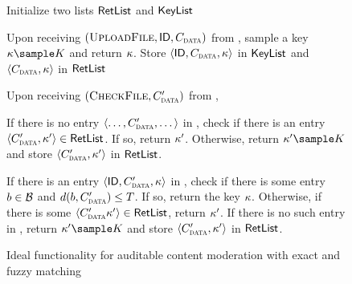 \begin{figure}[h]
{\begin{minipage}[t]{\textwidth}
		
		\enumListStartResume
		\item Initialize two lists $\mathsf{RetList}$ and $\mathsf{KeyList}$ 
		\item Upon receiving $(\uploadFile, \genericFileID, \clientMeta)$ from \client, sample a key $\genericSymmKey \getsr \encryptKeySpace$ and return $\kappa$. Store $\langle \genericFileID, \clientMeta, \genericSymmKey \rangle$ in $\mathsf{KeyList}$ and $\langle \clientMeta, \genericSymmKey \rangle$ in $\mathsf{RetList}$  

		
		\item Upon receiving $(\checkContent,  \clientMeta')$ from \server, 
		\enumListStartResume
		\item If there is no entry $\langle \dots, \clientMeta', \dots \rangle$ in \keyList, check if there is an entry $\langle \clientMeta', \genericSymmKey' \rangle \in \retList$. If so, return $\kappa'$. Otherwise, return $	\genericSymmKey' \getsr \encryptKeySpace$ and store $\langle \clientMeta', \genericSymmKey' \rangle$ in $\mathsf{RetList}$. 
		\item If there is an entry $\langle \genericFileID, \clientMeta', \genericSymmKey \rangle$ in \keyList, check if 
there is some entry $\genericBlocklistElmt \in \blocklist$ and $\distanceNotation[\distance][\genericBlocklistElmt][\clientMeta'] \le \threshold$. If so, return the key $\kappa$. Otherwise, if there is some $\langle \clientMeta' \genericSymmKey' \rangle \in \retList$, return $\kappa'$. If there is no such entry in \retList, return $\genericSymmKey' \getsr \encryptKeySpace$ and store $\langle \clientMeta', \genericSymmKey' \rangle$ in $\mathsf{RetList}$. 

		\enumListEnd
		\enumListEnd
\fi 

\end{minipage}
}
\caption{Ideal functionality for auditable content moderation with exact and fuzzy matching\label{fig:ideal_func}}
\end{figure}